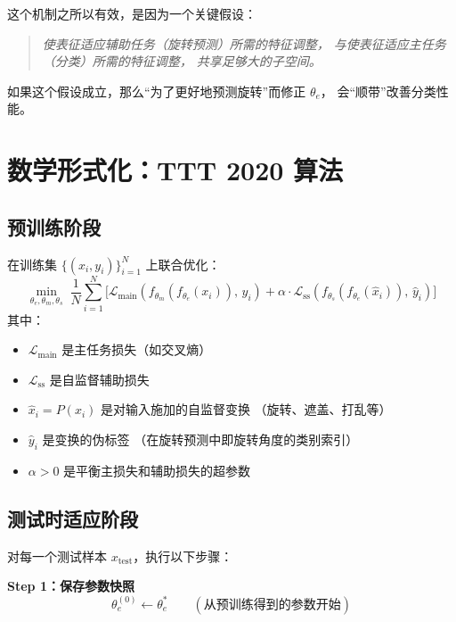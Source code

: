 这个机制之所以有效，是因为一个关键假设：
\begin{quote}
\textit{使表征适应辅助任务（旋转预测）所需的特征调整，
与使表征适应主任务（分类）所需的特征调整，
共享足够大的子空间。}
\end{quote}

如果这个假设成立，那么``为了更好地预测旋转''而修正 $\theta_e$，
会``顺带''改善分类性能。

\section{数学形式化：TTT 2020 算法}
\label{sec:ttt_math}

\subsection{预训练阶段}

在训练集 $\{(x_i, y_i)\}_{i=1}^N$ 上联合优化：
\begin{equation}
  \min_{\theta_e, \theta_m, \theta_s} \;
  \frac{1}{N} \sum_{i=1}^{N} \Big[
    \mathcal{L}_\text{main}\!\left(f_{\theta_m}(f_{\theta_e}(x_i)),\, y_i\right)
    + \alpha \cdot \mathcal{L}_\text{ss}\!\left(
      f_{\theta_s}(f_{\theta_e}(\hat{x}_i)),\, \hat{y}_i
    \right)
  \Big]
  \label{eq:ttt_pretrain}
\end{equation}
其中：
\begin{itemize}
  \item $\mathcal{L}_\text{main}$ 是主任务损失（如交叉熵）
  \item $\mathcal{L}_\text{ss}$ 是自监督辅助损失
  \item $\hat{x}_i = P(x_i)$ 是对输入施加的自监督变换
        （旋转、遮盖、打乱等）
  \item $\hat{y}_i$ 是变换的伪标签
        （在旋转预测中即旋转角度的类别索引）
  \item $\alpha > 0$ 是平衡主损失和辅助损失的超参数
\end{itemize}

\subsection{测试时适应阶段}

对每一个测试样本 $x_\text{test}$，执行以下步骤：

\textbf{Step 1：保存参数快照}
\begin{equation}
  \theta_e^{(0)} \leftarrow \theta_e^*
  \qquad (\text{从预训练得到的参数开始})
\end{equation}

